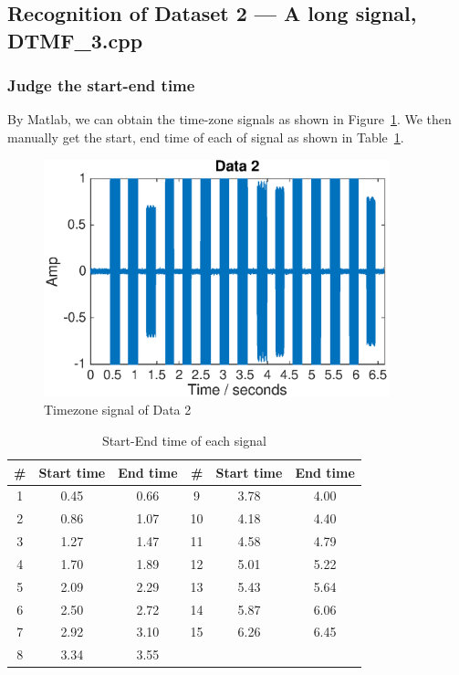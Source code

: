 \newpage

\subsection{Recognition of Dataset 2 --- A long signal, DTMF\_3.cpp}

\subsubsection{Judge the start-end time}
By Matlab, we can obtain the time-zone signals as shown in Figure~\ref{fig:timezone3}. We then manually get the start, end time of each of signal as shown in Table~\ref{tab:startendtime}.
\begin{figure}[htp]
	\centering
	\includegraphics[width=10cm]{../fig/data2.eps}
	\vspace{-0.1in}
	\caption{Timezone signal of Data 2}
	\label{fig:timezone3}

\end{figure}
\vspace{-0.2in}

\begin{table}[htp]
\centering
{\small
\begin{tabular}{c|cc|c|cc}
    \hline
    \textbf{\#} & \textbf{Start time} & \textbf{End time} & \textbf{\#} & \textbf{Start time} & \textbf{End time} \\ 
    \hline
	   1 & 0.45 & 0.66	& 9   & 3.78 & 4.00	\\
	   2 & 0.86 & 1.07	& 10  & 4.18 & 4.40	\\
	   3 & 1.27 & 1.47	& 11  & 4.58 & 4.79	\\
	   4 & 1.70 & 1.89	& 12  & 5.01 & 5.22	\\
	   5 & 2.09 & 2.29	& 13  & 5.43 & 5.64	\\
	   6 & 2.50 & 2.72	& 14  & 5.87 & 6.06	\\
	   7 & 2.92 & 3.10	& 15  & 6.26 & 6.45	\\
	   8 & 3.34 & 3.55	& & &\\
	\hline
\end{tabular}
}
\vspace{-0.1in}
\caption{Start-End time of each signal}
\label{tab:startendtime}
\end{table}
\vspace{-0.3in}

